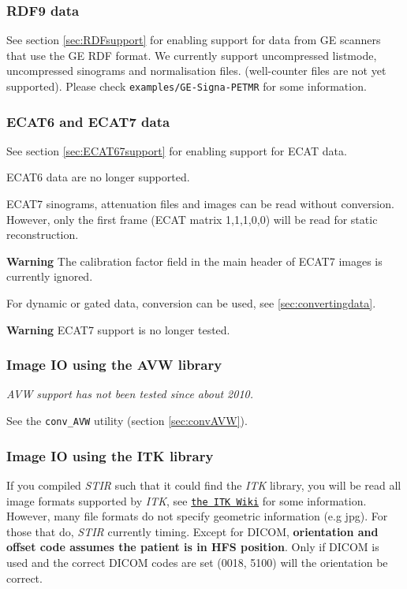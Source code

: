\documentclass{article}
\def\url#1#2{\mbox{\href{#1}{\tt #2}}}
\begin{document}
\subsubsection{RDF9 data}
See section \ref{sec:RDFsupport} for enabling support for data from GE scanners
that use the GE RDF format. We currently support uncompressed listmode,
uncompressed sinograms and normalisation files. (well-counter files are not
yet supported). Please check \texttt{examples/GE-Signa-PETMR} for some
information.

\subsubsection{ECAT6 and ECAT7 data} 
See section \ref{sec:ECAT67support} for enabling support for ECAT data.

ECAT6 data are no longer supported.

ECAT7 sinograms, attenuation files and images can be read without 
conversion. However, only the first frame (ECAT matrix 1,1,1,0,0) 
will be read for static reconstruction.

\textbf{Warning} The calibration factor field in the main header of ECAT7 images
is currently ignored.

For dynamic or gated data, conversion can be used, see \ref{sec:convertingdata}.

\textbf{Warning} ECAT7 support is no longer tested.

\subsubsection{Image IO using the AVW library}
\textit{AVW support has not been tested since about 2010.}

See the \texttt{conv\_AVW} utility (section \ref{sec:convAVW}).

\subsubsection{Image IO using the ITK library \label{sec:ITKIO}}
If you compiled \textit{STIR} such that it could find the \textit{ITK} library, you will be read
all image formats supported by \textit{ITK}, see \url{http://www.itk.org/Wiki/ITK/File_Formats}{the ITK Wiki}
for some information. However, many file formats do not specify geometric information (e.g jpg). For those
that do, \textit{STIR} currently timing. Except for DICOM, \textbf{orientation and offset code
assumes the patient is in HFS position}. Only if DICOM is used and the correct DICOM codes are set
(0018, 5100) will the orientation be correct.
\end{document}
